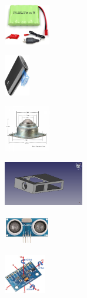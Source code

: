 \documentclass{beamer}
\begin{document}
\begin{frame}
\begin{minipage}{0.3\textwidth}
    \centering
    \includegraphics[width=2.0cm]{figs/bateria.jpg} 
\end{minipage}
\hfill
\begin{minipage}{0.3\textwidth}
    \centering
    \includegraphics[width=1.1cm]{figs/powerbank.jpg} 
\end{minipage}
\hfill
\begin{minipage}{0.3\textwidth}
    \centering
    \includegraphics[width=2.0cm]{figs/rueda_loca.png}
\end{minipage}



\begin{minipage}{0.3\textwidth}
    \centering
    \includegraphics[width=3.5cm]{figs/base.png} 
\end{minipage}
\hfill
\begin{minipage}{0.3\textwidth}
    \centering
    \includegraphics[width=2.0cm]{figs/hcsr04.jpg} 
\end{minipage}
\hfill
\begin{minipage}{0.3\textwidth}
    \centering
    \includegraphics[width=1.8cm]{figs/mpu9250.jpg}
\end{minipage}


\end{frame}
\end{document}
